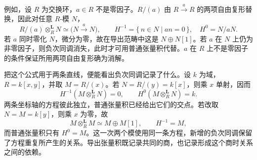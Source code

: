 例如，设 \(R\) 为交换环，\(a\in R\) 不是零因子。\(R/(a)\) 由 \(R\xrightarrow{a}R\) 的两项自由复形替换，因此对任意 \(R\)-模 \(N\)，
\[
	R/(a)\otimes_R^{\mathbf L}N\simeq \bigl(N\xrightarrow{a}N\bigr),\qquad H^{-1}=\{\,n\in N\mid an=0\,\},\quad H^0=N/aN.
\]
若 \(a\) 同时零化 \(N\)，微分为零，故在导出范畴中这是 \(N\oplus N[1]\)。若 \(a\) 在 \(N\) 上仍为非零因子，则负次同调消失，此时才可用普通张量积代替。\(a\) 在 \(R\) 上不是零因子的条件保证所用两项自由复形确为消解。

\ProseParagraphBreak
把这个公式用于两条直线，便能看出负次同调记录了什么。设 \(k\) 为域，\(R=k[x,y]\)，并取 \(M=R/(x)\)。若 \(N=R/(y)=k[x]\)，则乘 \(x\) 单射，因而
\[
	H^{-1}(M\otimes_R^{\mathbf L}N)=0,\qquad H^0(M\otimes_R^{\mathbf L}N)=k.
\]
两条坐标轴的方程彼此独立，普通张量积已经给出它们的交点。若改取 \(N=M=k[y]\)，则乘 \(x\) 为零，故
\[
	M\otimes_R^{\mathbf L}M\simeq M\oplus M[1],\qquad H^{-1}=M,
\]
而普通张量积只有 \(H^0=M\)。这一次两个模使用同一条方程，新增的负次同调保留了方程重复所产生的关系。导出张量积既记录共同的商，也记录形成这个商时关系之间的依赖。
